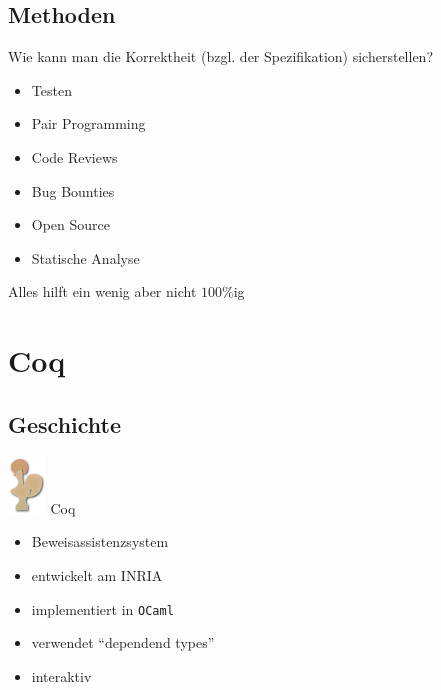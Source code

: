 \documentclass[aspectratio=169]{beamer}
\begin{document}
\subsection{Methoden}
\begin{frame}
  Wie kann man die Korrektheit (bzgl. der Spezifikation) sicherstellen?
  \begin{itemize}
  \item Testen
  \item Pair Programming
  \item Code Reviews
  \item Bug Bounties
  \item Open Source
  \item Statische Analyse \pause
  \end{itemize}
  \vfill
  Alles hilft ein wenig aber nicht $100\%$ig 
\end{frame}
\section{Coq}
\subsection{Geschichte}
\begin{frame}
  \begin{center}
    \includegraphics[width=1.0cm]{coq_logo.png}
    \Large{Coq}
  \end{center}
  \begin{itemize}
  \item Beweisassistenzsystem
  \item entwickelt am INRIA
  \item implementiert in \texttt{OCaml}
  \item verwendet ``dependend types''
  \item interaktiv
  \end{itemize}
\end{frame}
\end{document}
